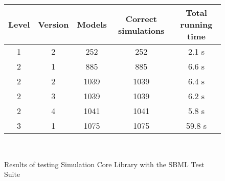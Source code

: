 \documentclass{article}
\begin{document}
\pagestyle{empty}



\begin{figure}    
\begin{tabular} {|c|c|c|c|c|}
\hline
Level & Version & Models & Correct simulations & Total running time\\\hline
1&2&252&252&2.1 s\\ \hline
2&1&885&885&6.6 s\\ \hline
2&2&1039&1039&6.4 s\\ \hline
2&3&1039&1039&6.2 s\\ \hline
2&4&1041&1041&5.8 s\\ \hline
3&1&1075&1075&59.8 s\\ \hline
\end{tabular}\\
\caption{Results of testing Simulation Core Library with the SBML Test Suite}
\end{figure}
\end{document}
